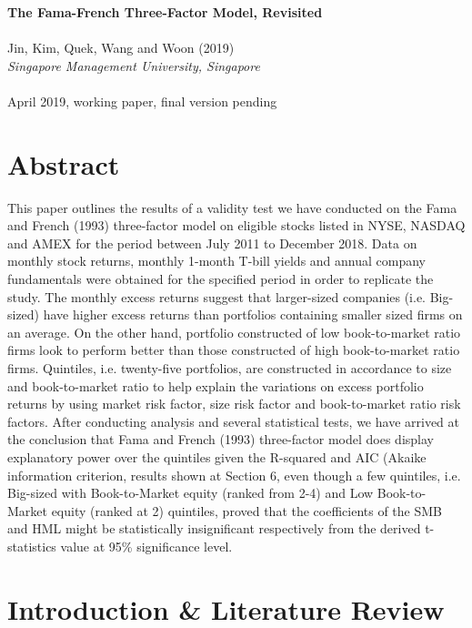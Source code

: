 \documentclass[12pt]{article}
\begin{document}
	\thispagestyle{plain}
	\noindent \Large \textbf{The Fama-French Three-Factor Model, Revisited}\\ \\
	\noindent Jin, Kim, Quek, Wang and Woon (2019)\\
	\noindent \normalsize \textit{Singapore Management University, Singapore}\\ \\
	\noindent April 2019, working paper, final version pending
	
		\section{Abstract} %
	
		This paper outlines the results of a validity test we have conducted on the Fama and French (1993) three-factor model on eligible stocks listed in NYSE, NASDAQ and AMEX for the period between July 2011 to December 2018. Data on monthly stock returns, monthly 1-month T-bill yields and annual company fundamentals were obtained for the specified period in order to replicate the study. The monthly excess returns suggest that larger-sized companies (i.e. Big-sized) have higher excess returns than portfolios containing smaller sized firms on an average. On the other hand, portfolio constructed of low book-to-market ratio firms look to perform better than those constructed of high book-to-market ratio firms. Quintiles, i.e. twenty-five portfolios, are constructed in accordance to size and book-to-market ratio to help explain the variations on excess portfolio returns by using market risk factor, size risk factor and book-to-market ratio risk factors. After conducting analysis and several statistical tests, we have arrived at the conclusion that Fama and French (1993) three-factor model does display explanatory power over the quintiles given the R-squared and AIC (Akaike information criterion, results shown at Section 6, even though a few quintiles, i.e.  Big-sized with Book-to-Market equity (ranked from 2-4) and Low Book-to-Market equity (ranked at 2) quintiles, proved that the coefficients of the SMB and HML might be statistically insignificant respectively from the derived t-statistics value at 95\% significance level.
	
	
	\section{Introduction \& Literature Review} %
	
\end{document}
